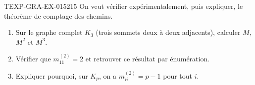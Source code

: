 \begin{exercice}{TEXP-GRA-EX-015}{2}{15}
On veut vérifier expérimentalement, puis expliquer, le théorème de comptage des
chemins.
\begin{enumerate}
  \item Sur le graphe complet $K_3$ (trois sommets deux à deux adjacents),
        calculer $M$, $M^2$ et $M^3$.
  \item Vérifier que $m^{(2)}_{11}=2$ et retrouver ce résultat par énumération.
  \item Expliquer pourquoi, sur $K_p$, on a $m^{(2)}_{ii}=p-1$ pour tout $i$.
\end{enumerate}
\end{exercice}
